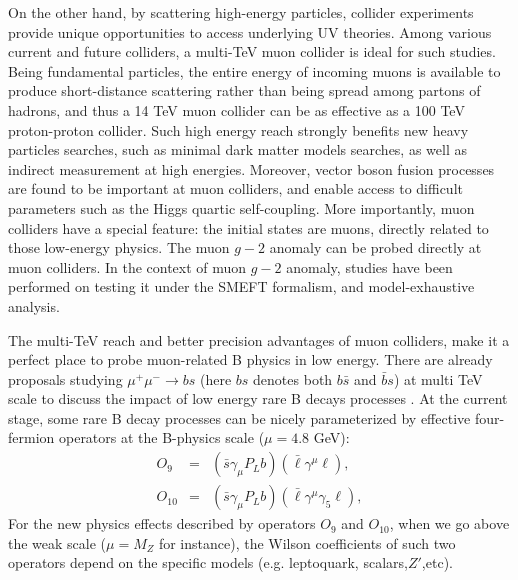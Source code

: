 \documentclass[a4paper,11pt]{article}
\begin{document}
On the other hand, by scattering high-energy particles,
collider experiments provide unique opportunities to access underlying UV theories.
Among various current and future colliders\cite{Shiltsev:2019rfl},
a multi-TeV muon collider\cite{Aime:2022flm,MuonCollider:2022xlm} is ideal for such studies.
Being fundamental particles, the entire energy of incoming muons is available to produce short-distance scattering rather than being spread among partons of hadrons,
and thus a 14 TeV muon collider can be as effective as a 100 TeV proton-proton collider\cite{Delahaye:2019omf}.
Such high energy reach strongly benefits new heavy particles searches, such as minimal dark matter models\cite{Han:2020uak,Bottaro:2021snn} searches,
as well as indirect measurement at high energies\cite{Buttazzo:2020uzc}.
Moreover, vector boson fusion processes are found to be important at muon colliders\cite{Costantini:2020stv},
and enable access to difficult parameters such as the Higgs quartic self-coupling\cite{Chiesa:2020awd}.
More importantly, muon colliders have a special feature: the initial states are muons, directly related to those low-energy physics. 
The muon $g-2$ anomaly can be probed directly at muon colliders\cite{Buttazzo:2020ibd}.
In the context of muon $g-2$ anomaly, studies have been performed on testing it under the SMEFT formalism\cite{Buttazzo:2020ibd}, 
and model-exhaustive analysis\cite{Buttazzo:2020ibd,Capdevilla:2020qel,Capdevilla:2021rwo,Capdevilla:2021kcf,Yin:2020afe}.

The multi-TeV reach and better precision advantages of muon colliders, make it a perfect place to probe muon-related B physics in low energy. 
There are already proposals studying $\mu^+\mu^-\to bs$ (here $bs$ denotes both $b\bar{s}$ and $\bar{b}s$) at multi TeV scale to discuss the impact of low energy rare B decays processes \cite{Altmannshofer:2022xri,Huang:2021nkl,Huang:2021biu}. 
At the current stage, some rare B decay processes can be nicely parameterized by effective four-fermion operators at the B-physics scale ($\mu= 4.8$ GeV):
 \begin{eqnarray}
   O_9 &=& (\bar{s}\gamma_\mu P_L b)(\bar{\ell}\gamma^{\mu}\ell),  \\
   O_{10} &=& (\bar{s}\gamma_\mu P_L b)(\bar{\ell}\gamma^{\mu}\gamma_5\ell),
\end{eqnarray}
For the new physics effects described by operators $O_9$ and $O_{10}$, when we go above the weak scale ($\mu=M_Z$ for instance), 
the Wilson coefficients of such two operators depend on the specific models (e.g. leptoquark, scalars,$Z'$,etc). 
\end{document}
